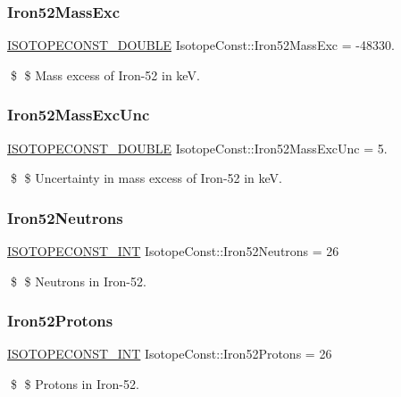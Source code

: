 \subsubsection{\texorpdfstring{Iron52\+Mass\+Exc}{Iron52MassExc}}
{\footnotesize\ttfamily \mbox{\hyperlink{group___isotope_const-_macros_ga8f45a7272ce02c0b4c65c44636ed719a}{I\+S\+O\+T\+O\+P\+E\+C\+O\+N\+S\+T\+\_\+\+D\+O\+U\+B\+LE}} Isotope\+Const\+::\+Iron52\+Mass\+Exc = -\/48330.}

\$ \$ Mass excess of Iron-\/52 in keV. \mbox{\label{group___isotope_const-_iron-_fe52_ga843b34614a5d0af1f8200cb7ab2ea7ba}} 
\subsubsection{\texorpdfstring{Iron52\+Mass\+Exc\+Unc}{Iron52MassExcUnc}}
{\footnotesize\ttfamily \mbox{\hyperlink{group___isotope_const-_macros_ga8f45a7272ce02c0b4c65c44636ed719a}{I\+S\+O\+T\+O\+P\+E\+C\+O\+N\+S\+T\+\_\+\+D\+O\+U\+B\+LE}} Isotope\+Const\+::\+Iron52\+Mass\+Exc\+Unc = 5.}

\$ \$ Uncertainty in mass excess of Iron-\/52 in keV. \mbox{\label{group___isotope_const-_iron-_fe52_ga322a1ecd92645c7b3528009836accd46}} 
\subsubsection{\texorpdfstring{Iron52\+Neutrons}{Iron52Neutrons}}
{\footnotesize\ttfamily \mbox{\hyperlink{group___isotope_const-_macros_ga5f18360b3e99483a35c32d789e62621c}{I\+S\+O\+T\+O\+P\+E\+C\+O\+N\+S\+T\+\_\+\+I\+NT}} Isotope\+Const\+::\+Iron52\+Neutrons = 26}

\$ \$ Neutrons in Iron-\/52. \mbox{\label{group___isotope_const-_iron-_fe52_ga6a411df34acafec276e482aefc7fe568}} 
\subsubsection{\texorpdfstring{Iron52\+Protons}{Iron52Protons}}
{\footnotesize\ttfamily \mbox{\hyperlink{group___isotope_const-_macros_ga5f18360b3e99483a35c32d789e62621c}{I\+S\+O\+T\+O\+P\+E\+C\+O\+N\+S\+T\+\_\+\+I\+NT}} Isotope\+Const\+::\+Iron52\+Protons = 26}

\$ \$ Protons in Iron-\/52. 